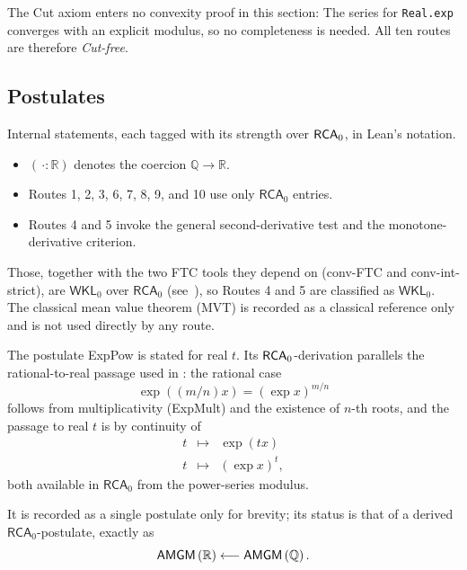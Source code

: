 \documentclass[11pt,reqno]{amsart}
\makeatletter
\theoremstyle{redplain}
\renewenvironment{quotation}
{\list{}{\listparindent\z@
		\itemindent\z@
		\rightmargin\leftmargin
		\parsep\z@}	\item\relax}
{\endlist}
\numberwithin{equation}{section}
\makeatother
\begin{document}
\begin{quotation}
\medskip \noindent The Cut axiom enters no convexity proof in this section:
\noindent The series for \texttt{Real.exp} converges with an explicit
modulus, so no completeness is needed. \noindent All ten routes are
therefore \emph{Cut-free}.
\end{quotation}

\subsection{Postulates}

\label{sec:convexity-postulates}

\begin{quotation}
\noindent Internal statements, each tagged with its strength over $\mathsf{%
RCA}_{0}$, in Lean's notation.
\end{quotation}

\begin{itemize}
\item $(\,\cdot :\mathbb{R})$ denotes the coercion $\mathbb{Q}\rightarrow 
\mathbb{R}$.

\item Routes 1, 2, 3, 6, 7, 8, 9, and 10 use only $\mathsf{RCA}_{0}$ entries.

\item Routes 4 and 5 invoke the general second-derivative test and the
monotone-derivative criterion.
\end{itemize}

\begin{quotation}
Those, together with the two FTC tools they depend on (\textsf{conv-FTC} and 
\textsf{conv-int-strict}), are $\mathsf{WKL}_{0}$ over $\mathsf{RCA}_{0}$
(see~\cite[II.7, IV.2.3]{Simpson2009}), so Routes 4 and 5 are classified as $%
\mathsf{WKL}_{0}$. The classical mean value theorem (\textsf{MVT}) is
recorded as a classical reference only and is not used directly by any route.

\noindent The postulate \textsf{ExpPow} is stated for real $t$. Its $\mathsf{%
RCA}_{0}$-derivation parallels the rational-to-real passage used in %
: the rational case 
\begin{equation*}
\exp ((m/n)x)=(\exp x)^{m/n}
\end{equation*}
follows from multiplicativity (\textsf{ExpMult}) and the existence of $n$-th
roots, and the passage to real $t$ is by continuity of 
\begin{eqnarray*}
t &\mapsto &\exp (tx) \\
t &\mapsto &(\exp x)^{t},
\end{eqnarray*}
both available in $\mathsf{RCA}_{0}$ from the power-series modulus.

It is recorded as a single postulate only for brevity; its status is that of
a derived $\mathsf{RCA}_{0}$-postulate, exactly as 
\begin{equation*}
\mathsf{AMGM}\left( \mathsf{%
\mathbb{R}
}\right) \longleftarrow \mathsf{AMGM}\left( 
\mathbb{Q}
\right) .\medskip
\end{equation*}
\end{quotation}
\end{document}
